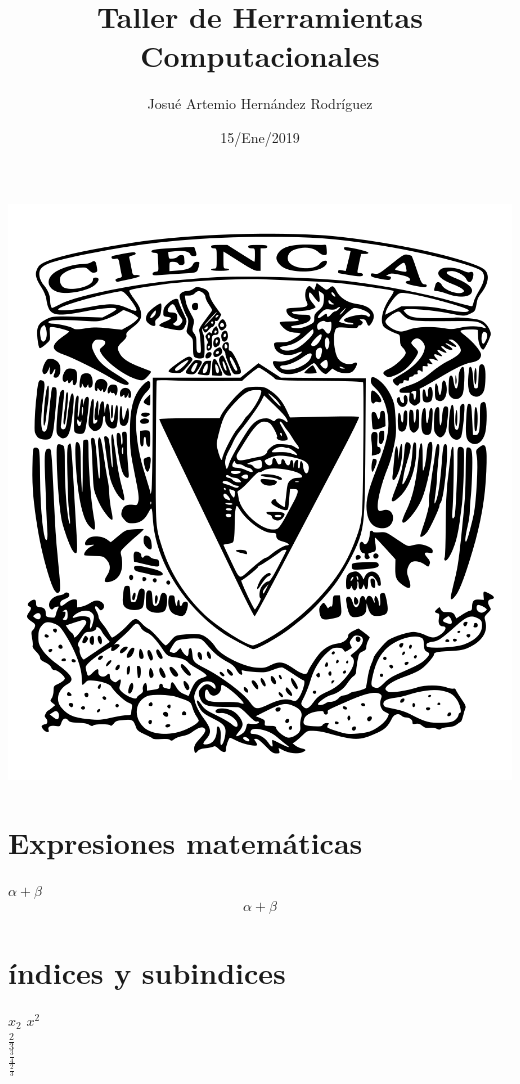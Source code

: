 \documentclass{article}
\title{\Huge Taller de Herramientas Computacionales}
\author{Josué Artemio Hernández Rodríguez}
\date{15/Ene/2019}
\begin{document}
	\maketitle
	\begin{center}
		\includegraphics[scale=0.3]{2.png}
	\end{center}
\newpage

\section*{Expresiones matemáticas}
$\alpha + \beta$\\ %
\[\alpha + \beta\]

\section*{índices y subindices}
$x_{2}$
$x^{2}$	\\

$\frac{2}{3}$\\
$\frac{\frac{3}{4}}{\frac{2}{3}}$\\
\end{document}
